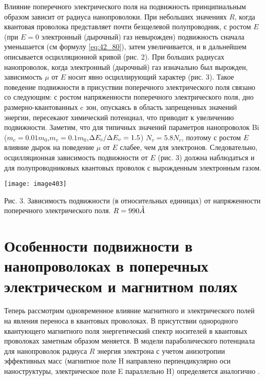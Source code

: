Влияние поперечного электрического поля на подвижность принципиальным образом зависит от радиуса нанопроволоки. При небольших значениях $R$, когда квантовая проволока представляет почти безщелевой полупроводник, с ростом $E$ (при $E=0$ электронный (дырочный) газ невырожден) подвижность сначала уменьшается (см формулу \eqref{eq:42_80}), затем увеличивается, и в дальнейшем описывается осцилляционной кривой (рис. 2). При больших радиусах нанопроволок, когда электронный (дырочный) газ изначально был вырожден, зависимость $\mu $ от $E$ носит явно осциллирующий характер (рис. 3). Такое поведение подвижности в присуствии поперечного электрического поля связано со следующим: с ростом напряженности поперечного электрического поля, дно размерно-квантованных c зон, опускаясь в область запрещенных значений энергии, пересекают химический потенциал, что приводит к увеличению подвижности. Заметим, что для типичных значений параметров нанопроволок Bi ($m_{c} =0.01m_{0} $,$m_{v} =0.1m_{0} $,${\Delta E_{c}  \mathord{\left/{\vphantom{\Delta E_{c}  \Delta E_{v} }}\right.\kern-\nulldelimiterspace} \Delta E_{v} } =1.5$) $N_{v} =5.8N_{c} $, поэтому с ростом $E$ влияние дырок на поведение $\mu $ от $E$ слабее, чем для электронов. Следовательно, осцилляционная зависимость подвижности от $E$ (рис. 3) должна наблюдаться и для полупроводниковых квантовых проволок с вырожденным электронным газом.

\texttt{[image: image403]}

\noindent Рис. 3. Зависимость подвижности (в относительных единицах) от напряженности поперечного электрического поля. $R=990 \AA$



\section{Особенности подвижности в нанопроволоках в поперечных электрическом и магнитном полях} \label{sect4_3}
Теперь рассмотрим одновременное влияние магнитного и электрического полей на явления переноса в квантовых проволоках. В присутствии однородного квантующего магнитного поля энергетический спектр носителей в квантовых проволоках заметным образом меняется. В модели параболического потенциала для нанопроволок радиуса $R$ энергия электрона с учетом анизотропии эффективных масс (магнитное поле H  направлено перпендикулярно оси наноструктуры, электрическое поле E параллельно H) определяется аналогично \cite{Geiler1998}.


